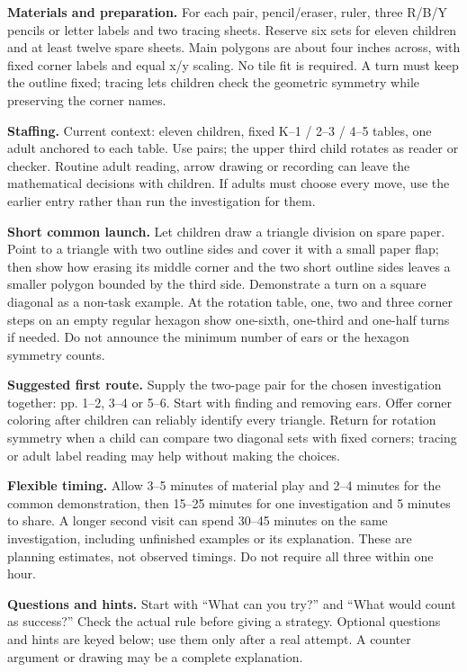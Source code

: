 \documentclass[11pt]{article}
\begin{document}
\textbf{Materials and preparation.} For each pair, pencil/eraser, ruler, three R/B/Y pencils or letter labels and two tracing sheets. Reserve six sets for eleven children and at least twelve spare sheets. Main polygons are about four inches across, with fixed corner labels and equal x/y scaling. No tile fit is required. A turn must keep the outline fixed; tracing lets children check the geometric symmetry while preserving the corner names.

\textbf{Staffing.} Current context: eleven children, fixed K--1 / 2--3 / 4--5 tables, one adult anchored to each table. Use pairs; the upper third child rotates as reader or checker. Routine adult reading, arrow drawing or recording can leave the mathematical decisions with children. If adults must choose every move, use the earlier entry rather than run the investigation for them.

\textbf{Short common launch.} Let children draw a triangle division on spare paper. Point to a triangle with two outline sides and cover it with a small paper flap; then show how erasing its middle corner and the two short outline sides leaves a smaller polygon bounded by the third side. Demonstrate a turn on a square diagonal as a non-task example. At the rotation table, one, two and three corner steps on an empty regular hexagon show one-sixth, one-third and one-half turns if needed. Do not announce the minimum number of ears or the hexagon symmetry counts.

\textbf{Suggested first route.} Supply the two-page pair for the chosen investigation together: pp. 1--2, 3--4 or 5--6. Start with finding and removing ears. Offer corner coloring after children can reliably identify every triangle. Return for rotation symmetry when a child can compare two diagonal sets with fixed corners; tracing or adult label reading may help without making the choices.

\textbf{Flexible timing.} Allow 3--5 minutes of material play and 2--4 minutes for the common demonstration, then 15--25 minutes for one investigation and 5 minutes to share. A longer second visit can spend 30--45 minutes on the same investigation, including unfinished examples or its explanation. These are planning estimates, not observed timings. Do not require all three within one hour.

\textbf{Questions and hints.} Start with ``What can you try?'' and ``What would count as success?'' Check the actual rule before giving a strategy. Optional questions and hints are keyed below; use them only after a real attempt. A counter argument or drawing may be a complete explanation.
\end{document}
